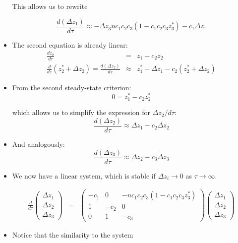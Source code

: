 \documentclass{article}
\begin{document}
\begin{itemize}
This allows us to rewrite 

\[ \frac{d \left(\Delta z_1 \right)}{d \tau} \approx   - \Delta z_3 n c_1 c_2 c_3 \left( 1 - c_1c_2c_3 z_3^* \right) -  c_1 \Delta z_1 \]

\item The second equation is  already linear:
\begin{eqnarray*}
\frac{d z_2}{d \tau} & = & z_1 - c_2 z_2\\
 \frac{d}{d \tau} \left( z_2^* + \Delta z_2\right) = \frac{d \left(\Delta z_2 \right)}{d \tau}  & \approx & z_1^* + \Delta z_1 - c_2 \left( z_2^* + \Delta z_2 \right)
 \end{eqnarray*}
 
\item From the second steady-state criterion:
\[ 0 =  z_1^* - c_2 z_2^* \]

which allows us to simplify the expression for $\Delta z_2/d \tau$:
\[  \frac{d \left(\Delta z_2 \right)}{d \tau}  \approx \Delta z_1 - c_2  \Delta z_2 \]

\item And analogously:
\[ \frac{d \left(\Delta z_3 \right)}{d \tau}  \approx \Delta z_2 - c_3  \Delta z_3 \]

\item We now have a linear system, which is stable if $\Delta z_i \to 0$ as $\tau \to \infty$.

\begin{eqnarray}
\frac{d}{d\tau} \begin{pmatrix} \Delta z_1 \\ \Delta z_2 \\ \Delta z_3 \end{pmatrix} & = & \begin{pmatrix} -c_1 & 0 & - n c_1 c_2 c_3 \left( 1 - c_1c_2c_3 z_3^* \right) \\ 1 & -c_2 & 0\\ 0 & 1 & -c_3 \end{pmatrix} \begin{pmatrix} \Delta z_1 \\ \Delta z_2 \\ \Delta z_3 \end{pmatrix} \label{eqn:goodwinlinearized}
\end{eqnarray}

\item Notice that the similarity to the system


\end{itemize}
\end{document}
